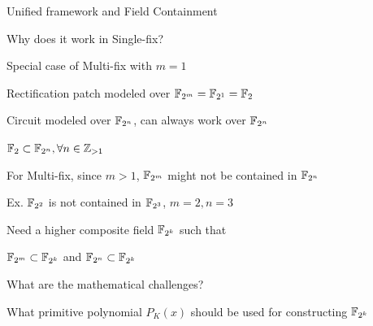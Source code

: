 \begin{frame}{\large Unified framework and Field Containment}
\bi
	\item Why does it work in Single-fix?
	\bi
		\item Special case of Multi-fix with $m=1$
		\item Rectification patch modeled over ${\mathbb{F}}_{2^m} = {\mathbb{F}}_{2^1} = {\mathbb{F}}_2$
		\item Circuit modeled over ${\mathbb{F}}_{2^n}$, can always work over ${\mathbb{F}}_{2^n}$
		\bi
			\item ${\mathbb{F}}_2 \subset {\mathbb{F}}_{2^n}, \forall n \in {\mathbb{Z}}_{>1}$
		\ei
	\ei
	\vspace{0.1in}
	\item For Multi-fix, since $m > 1$, ${\mathbb{F}}_{2^m}$ might not be contained in ${\mathbb{F}}_{2^n}$
	\bi
		\item Ex. ${\mathbb{F}}_{2^2}$ is not contained in ${\mathbb{F}}_{2^3}$, $m=2,n=3$
	\ei  
	\vspace{0.1in}
	\item Need a higher composite field ${\mathbb{F}}_{2^k}$ such that 
	\bi
		\item ${\mathbb{F}}_{2^m} \subset {\mathbb{F}}_{2^k}$ and ${\mathbb{F}}_{2^n} \subset {\mathbb{F}}_{2^k}$
	\item What are the mathematical challenges?
	\item What primitive polynomial $P_K(x)$ should be used for constructing ${\mathbb{F}}_{2^k}$
	\ei
\ei
\end{frame}